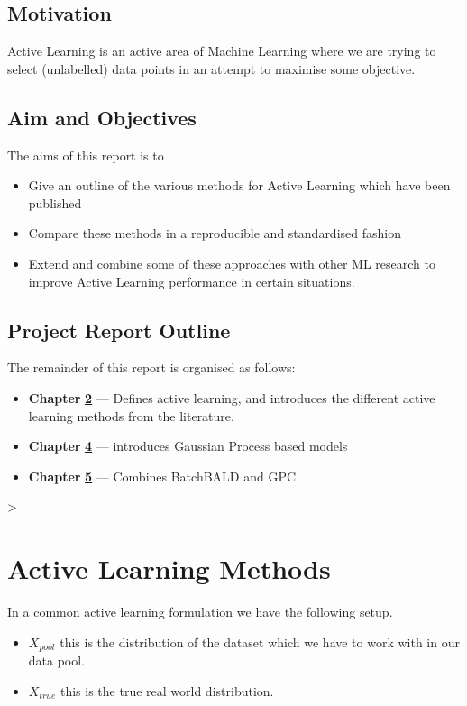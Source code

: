 \documentclass[12pt, a4paper]{report}
\theoremstyle{definition}
\begin{document}
\section{Motivation}

Active Learning is an active area of Machine Learning where we are trying to select (unlabelled) data points in an attempt to maximise some objective.
\section{Aim and Objectives}

The aims of this report is to

\begin{itemize}
    \item Give an outline of the various methods for Active Learning which have been published
    \item Compare these methods in a reproducible and standardised fashion
    \item Extend and combine some of these approaches with other ML research to improve Active Learning performance in certain situations.
\end{itemize}
\section{Project Report Outline}
The remainder of this report is organised as follows:
\begin{itemize}
    \item[] \textbf{Chapter} \hyperref[Chap2]{\textbf{2}} --- Defines active learning, and introduces the different active learning methods from the literature.
    \item[] \textbf{Chapter} \hyperref[Gaussian Processes]{\textbf{4}} --- introduces Gaussian Process based models
    \item[] \textbf{Chapter} \hyperref[Chap5]{\textbf{5}} --- Combines BatchBALD and GPC
\end{itemize}
>

\chapter{Active Learning Methods}
\label{Chap2}

In a common active learning formulation we have the following setup.

\begin{itemize}
    \item $X_{pool}$ this is the distribution of the dataset which we have to work with in our data pool.
    \item $X_{true}$ this is the true real world distribution.
\end{itemize}
\end{document}
